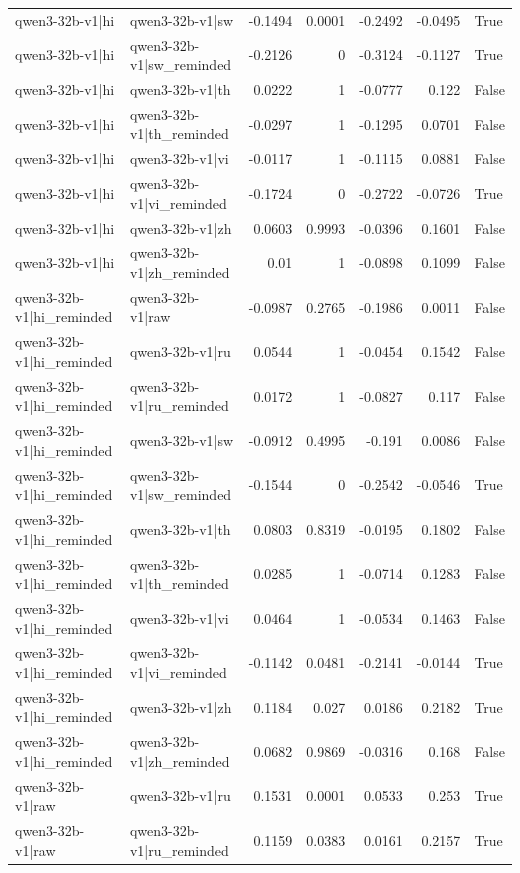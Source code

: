 \begin{table}
\begin{tabular}{l l r r r r l}
qwen3-32b-v1|hi & qwen3-32b-v1|sw & -0.1494 & 0.0001 & -0.2492 & -0.0495 & True \\
qwen3-32b-v1|hi & qwen3-32b-v1|sw_reminded & -0.2126 & 0 & -0.3124 & -0.1127 & True \\
qwen3-32b-v1|hi & qwen3-32b-v1|th & 0.0222 & 1 & -0.0777 & 0.122 & False \\
qwen3-32b-v1|hi & qwen3-32b-v1|th_reminded & -0.0297 & 1 & -0.1295 & 0.0701 & False \\
qwen3-32b-v1|hi & qwen3-32b-v1|vi & -0.0117 & 1 & -0.1115 & 0.0881 & False \\
qwen3-32b-v1|hi & qwen3-32b-v1|vi_reminded & -0.1724 & 0 & -0.2722 & -0.0726 & True \\
qwen3-32b-v1|hi & qwen3-32b-v1|zh & 0.0603 & 0.9993 & -0.0396 & 0.1601 & False \\
qwen3-32b-v1|hi & qwen3-32b-v1|zh_reminded & 0.01 & 1 & -0.0898 & 0.1099 & False \\
qwen3-32b-v1|hi_reminded & qwen3-32b-v1|raw & -0.0987 & 0.2765 & -0.1986 & 0.0011 & False \\
qwen3-32b-v1|hi_reminded & qwen3-32b-v1|ru & 0.0544 & 1 & -0.0454 & 0.1542 & False \\
qwen3-32b-v1|hi_reminded & qwen3-32b-v1|ru_reminded & 0.0172 & 1 & -0.0827 & 0.117 & False \\
qwen3-32b-v1|hi_reminded & qwen3-32b-v1|sw & -0.0912 & 0.4995 & -0.191 & 0.0086 & False \\
qwen3-32b-v1|hi_reminded & qwen3-32b-v1|sw_reminded & -0.1544 & 0 & -0.2542 & -0.0546 & True \\
qwen3-32b-v1|hi_reminded & qwen3-32b-v1|th & 0.0803 & 0.8319 & -0.0195 & 0.1802 & False \\
qwen3-32b-v1|hi_reminded & qwen3-32b-v1|th_reminded & 0.0285 & 1 & -0.0714 & 0.1283 & False \\
qwen3-32b-v1|hi_reminded & qwen3-32b-v1|vi & 0.0464 & 1 & -0.0534 & 0.1463 & False \\
qwen3-32b-v1|hi_reminded & qwen3-32b-v1|vi_reminded & -0.1142 & 0.0481 & -0.2141 & -0.0144 & True \\
qwen3-32b-v1|hi_reminded & qwen3-32b-v1|zh & 0.1184 & 0.027 & 0.0186 & 0.2182 & True \\
qwen3-32b-v1|hi_reminded & qwen3-32b-v1|zh_reminded & 0.0682 & 0.9869 & -0.0316 & 0.168 & False \\
qwen3-32b-v1|raw & qwen3-32b-v1|ru & 0.1531 & 0.0001 & 0.0533 & 0.253 & True \\
qwen3-32b-v1|raw & qwen3-32b-v1|ru_reminded & 0.1159 & 0.0383 & 0.0161 & 0.2157 & True \\

\end{tabular}
\end{table}
